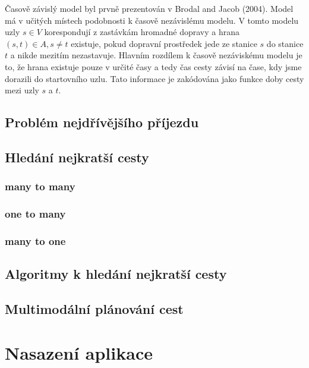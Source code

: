 \documentclass[thesis=M,czech]{FITthesis}[2019/12/23]
\theoremstyle{plain}
\theoremstyle{definition}
\begin{document}
Časově závislý model byl prvně prezentován v Brodal and Jacob (2004)\cite{time-dependent-networks-as-models-to-achieve-fast-exact-time-table-queries}. Model má v učitých místech podobnosti k časově nezávislému modelu. V tomto modelu uzly  $ s \in V $ korespondují z zastávkám hromadné dopravy a hrana $ (s, t) \in A, s \neq t $ existuje, pokud dopravní prostředek jede ze stanice $s$ do stanice $t$ a nikde mezitím nezastavuje. Hlavním rozdílem k časově nezáviskému modelu je to, že hrana existuje pouze v určité časy a tedy čas cesty závisí na čase, kdy jsme dorazili do startovního uzlu. Tato informace je zakódována jako funkce doby cesty mezi uzly $s$ a $t$.


\subsection{Problém nejdřívějšího příjezdu}


\subsection{Hledání nejkratší cesty}

\subsubsection{many to many}

\subsubsection{one to many}

\subsubsection{many to one}


\subsection{Algoritmy k hledání nejkratší cesty}



\subsection{Multimodální plánování cest}


\section{Nasazení aplikace}
\end{document}
